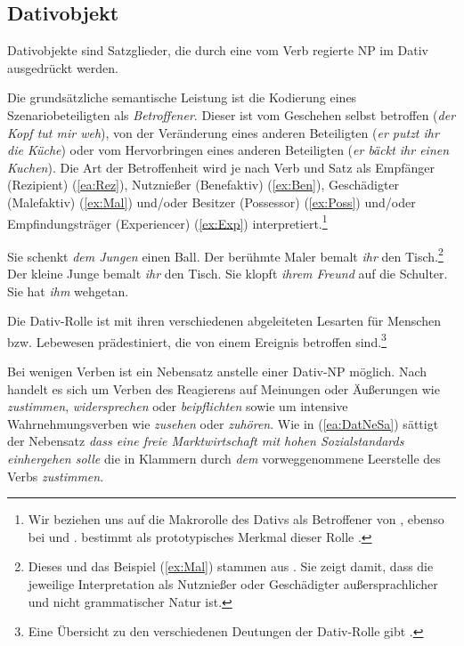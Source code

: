 \subsection{Dativobjekt}\label{subsection:Datobj}

Dativobjekte sind Satzglieder, die durch eine vom Verb regierte NP im Dativ ausgedrückt werden. 

Die grundsätzliche semantische Leistung ist die Kodierung eines Szenariobeteiligten als \textit{Betroffener}. Dieser ist vom Geschehen selbst betroffen (\textit{der Kopf tut mir weh}), von der Veränderung eines anderen Beteiligten (\textit{er putzt ihr die Küche}) oder vom Hervorbringen eines anderen Beteiligten (\textit{er bäckt ihr einen Kuchen}). Die Art der Betroffenheit wird je nach Verb und Satz als Empfänger (Rezipient) (\ref{ea:Rez}), Nutznießer (Benefaktiv) (\ref{ex:Ben}), Geschädigter (Malefaktiv) (\ref{ex:Mal}) und/oder Besitzer (Possessor) (\ref{ex:Poss}) und/oder Empfindungsträger (Experiencer) (\ref{ex:Exp}) interpretiert.\footnote{Wir beziehen uns auf die Makrorolle des Dativs als Betroffener von \citet[285, 321]{Wegener1985}, ebenso bei \citet[35, 244]{Ogawa2003} und \citet[502]{Agel2017}. \citet[157]{Welke2019} bestimmt als prototypisches Merkmal dieser Rolle .} 

\ea \label{ea:DativInterpreation}
\ea \label{ea:Rez} Sie schenkt \textit{dem Jungen} einen Ball.
\ex \label{ex:Ben} Der berühmte Maler bemalt \textit{ihr} den Tisch.\footnote{Dieses und das Beispiel (\ref{ex:Mal}) stammen aus \citet[100]{Wegener1985}. Sie zeigt damit, dass die jeweilige Interpretation als Nutznießer oder Geschädigter außersprachlicher und nicht grammatischer Natur ist.}
\ex \label{ex:Mal} Der kleine Junge bemalt \textit{ihr} den Tisch.
\ex \label{ex:Poss} Sie klopft \textit{ihrem Freund} auf die Schulter.
\ex \label{ex:Exp} Sie hat \textit{ihm} wehgetan.
\z 
\z 

Die Dativ-Rolle ist mit ihren verschiedenen abgeleiteten Lesarten für Menschen bzw. Lebewesen prädestiniert, die von einem Ereignis betroffen sind.\footnote{Eine Übersicht zu den verschiedenen Deutungen der Dativ-Rolle gibt \citet[272--285]{Wegener1985}.} 

Bei wenigen Verben ist ein Nebensatz anstelle einer Dativ-NP möglich. Nach \citet[419]{Wegener2013} handelt es sich um Verben des Reagierens auf Meinungen oder Äußerungen wie \textit{zustimmen}, \textit{widersprechen} oder \textit{beipflichten} sowie um intensive Wahrnehmungsverben wie \textit{zusehen} oder \textit{zuhören}. Wie in (\ref{ea:DatNeSa}) sättigt der Nebensatz \textit{dass eine freie Marktwirtschaft mit hohen Sozialstandards einhergehen solle} die in Klammern durch \textit{dem} vorweggenommene Leerstelle des Verbs \textit{zustimmen}.

